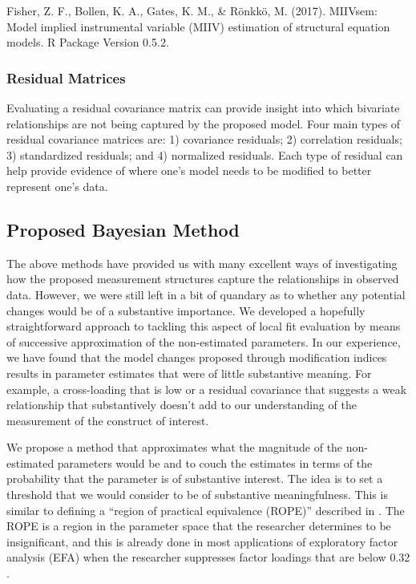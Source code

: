 \documentclass[man, noextraspace, floatsintext, 12pt]{apa7}
\begin{document}
 Fisher, Z. F., Bollen, K. A., Gates, K. M., \& Rönkkö, M. (2017). MIIVsem: Model implied instrumental variable (MIIV) estimation of structural equation models. R Package Version 0.5.2. 


\subsubsection{Residual Matrices}

Evaluating a residual covariance matrix can provide insight into which bivariate relationships are not being captured by the proposed model.
Four main types of residual covariance matrices are: 1) covariance residuals; 2) correlation residuals; 3) standardized residuals; and 4) normalized residuals.
Each type of residual can help provide evidence of where one's model needs to be modified to better represent one's data.

\subsection{Proposed Bayesian Method}

The above methods have provided us with many excellent ways of investigating how the proposed measurement structures capture the relationships in observed data.
However, we were still left in a bit of quandary as to whether any potential changes would be of a substantive importance.
We developed a hopefully straightforward approach to tackling this aspect of local fit evaluation by means of successive approximation of the non-estimated parameters.
In our experience, we have found that the model changes proposed through modification indices results in parameter estimates that were of little substantive meaning.
For example, a cross-loading that is low or a residual covariance that suggests a weak relationship that substantively doesn't add to our understanding of the measurement of the construct of interest.

We propose a method that approximates what the magnitude of the non-estimated parameters would be and to couch the estimates in terms of the probability that the parameter is of substantive interest.
The idea is to set a threshold that we would consider to be of substantive meaningfulness.
This is similar to defining a ``region of practical equivalence (ROPE)'' described in \textcite{Shi2019}.
The ROPE is a region in the parameter space that the researcher determines to be insignificant, and this is already done in most applications of exploratory factor analysis (EFA) when the researcher suppresses factor loadings that are below 0.32 \citep{Benson1998}.
\end{document}
